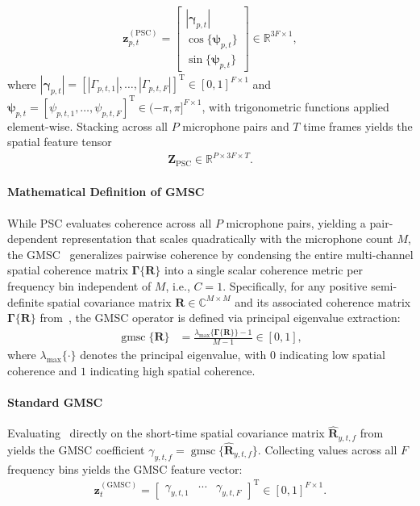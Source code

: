 \documentclass[lettersize,journal]{IEEEtran}
\begin{document}
\begin{align}
  \mathbf{z}_{p,t}^{(\mathrm{PSC})} = \begin{bmatrix} |\bm{\gamma}_{p,t}| \\ \cos\{\bm{\psi}_{p,t}\} \\ \sin\{\bm{\psi}_{p,t}\} \end{bmatrix} \in \mathbb{R}^{3F \times 1},
  \label{eq:feat_psc_vec}
\end{align}
where $|\bm{\gamma}_{p,t}| = [|\Gamma_{p,t,1}|, \dots, |\Gamma_{p,t,F}|]^{\mathrm{T}} \in [0, 1]^{F \times 1}$ and $\bm{\psi}_{p,t} = [\psi_{p,t,1}, \dots, \psi_{p,t,F}]^{\mathrm{T}} \in (-\pi, \pi]^{F \times 1}$, with trigonometric functions applied element-wise.
Stacking across all $P$ microphone pairs and $T$ time frames yields the spatial feature tensor
\begin{align}
  \mathbf{Z}_{\mathrm{PSC}} \in \mathbb{R}^{P \times 3F \times T}.
  \label{eq:feat_psc_tensor}
\end{align}

\paragraph{Mathematical Definition of GMSC}
While \gls{PSC} evaluates coherence across all $P$ microphone pairs, yielding a pair-dependent representation that scales quadratically with the microphone count $M$, the \gls{GMSC}~\cite{gmsc_ramirez_2008,gode2026dnnbased} generalizes pairwise coherence by condensing the entire multi-channel spatial coherence matrix $\bm{\Gamma}\{\mathbf{R}\}$ into a single scalar coherence metric per frequency bin independent of $M$, i.e., $C=1$. Specifically, for any positive semi-definite spatial covariance matrix $\mathbf{R} \in \mathbb{C}^{M \times M}$ and its associated coherence matrix $\bm{\Gamma}\{\mathbf{R}\}$ from~, the \gls{GMSC} operator is defined via principal eigenvalue extraction:
\begin{align}
  \operatorname{gmsc}\{\mathbf{R}\} &= \frac{\lambda_{\max}\{\bm{\Gamma}\{\mathbf{R}\}\} - 1}{M - 1} \in [0, 1], \label{eq:gmsc_operator}
\end{align}
where $\lambda_{\max}\{\cdot\}$ denotes the principal eigenvalue, with $0$ indicating low spatial coherence and $1$ indicating high spatial coherence.

\paragraph{Standard GMSC}
Evaluating~ directly on the short-time spatial covariance matrix $\widehat{\mathbf{R}}_{y,t,f}$ from~ yields the \gls{GMSC} coefficient $\gamma_{y,t,f} = \operatorname{gmsc}\{\widehat{\mathbf{R}}_{y,t,f}\}$. Collecting values across all $F$ frequency bins yields the \gls{GMSC} feature vector:
\begin{align}
  \mathbf{z}_{t}^{(\mathrm{GMSC})} = \begin{bmatrix} \gamma_{y,t,1} & \cdots & \gamma_{y,t,F} \end{bmatrix}^{\mathrm{T}} \in [0, 1]^{F \times 1}.
  \label{eq:feat_gmsc_vec}
\end{align}
\end{document}
